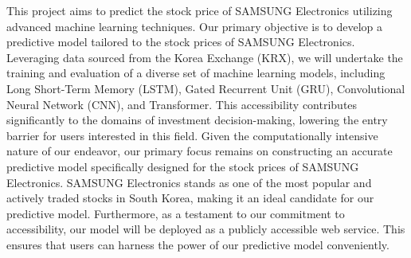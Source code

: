 This project aims to predict the stock price of SAMSUNG Electronics utilizing advanced machine learning techniques. 
Our primary objective is to develop a predictive model tailored to the stock prices of SAMSUNG Electronics. 
Leveraging data sourced from the Korea Exchange (KRX), we will undertake the training and evaluation of a diverse set of machine learning models, 
including Long Short-Term Memory (LSTM), Gated Recurrent Unit (GRU), Convolutional Neural Network (CNN), and Transformer.
This accessibility contributes significantly to the domains of investment decision-making, lowering the entry barrier for users interested in this field.
Given the computationally intensive nature of our endeavor, our primary focus remains on constructing an accurate predictive model specifically designed for the stock prices of SAMSUNG Electronics. 
SAMSUNG Electronics stands as one of the most popular and actively traded stocks in South Korea, making it an ideal candidate for our predictive model.
Furthermore, as a testament to our commitment to accessibility, our model will be deployed as a publicly accessible web service. 
This ensures that users can harness the power of our predictive model conveniently.

